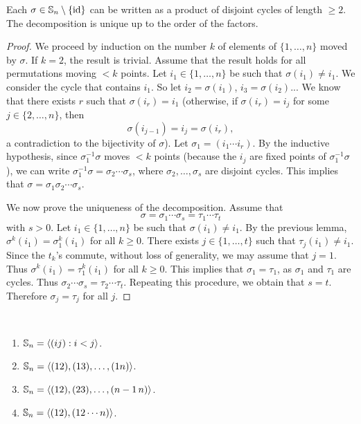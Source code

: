 \begin{theorem}
Each $\sigma\in\mathbb{S}_n\setminus\{\operatorname{id}\}$ can be written as a product
of disjoint cycles of length 
 $\geq2$. The decomposition is unique up to 
 the order of the factors. 
 \end{theorem}

\begin{proof}
    We proceed by induction on the number $k$ 
    of elements of $\{1,\dots,n\}$ moved by $\sigma$. If $k=2$, 
    the result is trivial. Assume that the result 
    holds for all permutations moving $<k$ points. Let
    $i_1\in\{1,\dots,n\}$ be such that $\sigma(i_1)\ne i_1$. We 
    consider the cycle that contains $i_1$. So let 
        $i_2=\sigma(i_1)$, $i_3=\sigma(i_2)$... We know that 
        there exists $r$ such that $\sigma(i_r)=i_1$
 (otherwise, if $\sigma(i_r)=i_j$ for some 
        $j\in\{2,\dots,n\}$, then 
        \[
        \sigma(i_{j-1})=i_j=\sigma(i_r),
        \]
        a contradiction to the bijectivity of $\sigma$). 
        Let $\sigma_1=(i_1\cdots i_r)$. By the inductive hypothesis, since 
        $\sigma_1^{-1}\sigma$ moves $<k$ points (because 
        the $i_j$ are fixed points of $\sigma_1^{-1}\sigma$), 
        we can write $\sigma_1^{-1}\sigma=\sigma_2\cdots\sigma_s$, where 
        $\sigma_2,\dots,\sigma_s$ are disjoint cycles. 
        This implies that $\sigma=\sigma_1\sigma_2\cdots\sigma_s$.

        We now prove the uniqueness of the decomposition. 
        Assume that 
        \[
        \sigma=\sigma_1\cdots\sigma_s=\tau_1\cdots\tau
_t
\]
with $s>0$. Let $i_1\in\{1,\dots,n\}$ be such that 
        $\sigma(i_1)\ne i_1$. By the previous lemma, $\sigma^k(i_1)=\sigma_1^k(i_1)$ for all $k\geq0$.
        There exists $j\in\{1,\dots,t\}$ such that 
        $\tau_j(i_1)\ne i_1$. Since the $t_k$'s commute, 
        without loss of generality, we may assume that $j=
1$. Thus $\sigma^k(i_1)=\tau_1^k(i_1)$ for all $k\geq0$.  
This implies that 
        $\sigma_1=\tau_1$, as $\sigma_1$ and $\tau_1$ are cycles. 
        Thus $\sigma_2\cdots\sigma_s=\tau_2\cdots\tau_t$. Repeating
        this procedure, we obtain that $s=t$. Therefore 
        $\sigma_j=\tau_j$ for all $j$.
\end{proof}

\begin{corollary}\
\label{cor:generation}
        \begin{enumerate}
                \item $\mathbb{S}_n=\langle (ij):i<j\rangle$.
                \item $\mathbb{S}_n=\langle (12),(13),\dots,(1n)\rangle$.
                \item $\mathbb{S}_n=\langle (12),(23),\dots,(n-1\,n)\rangle$.
                \item $\mathbb{S}_n=\langle (12),(12\cdots n)\rangle$.
        \end{enumerate}
\end{corollary}

